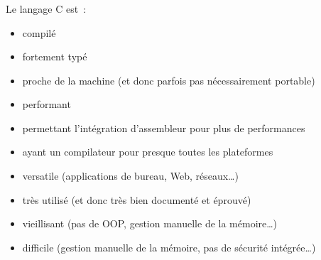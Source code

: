 \begin{frame}
  \frametitle{\secname}
  \framesubtitle{\subsecname}
  {\small Le langage C est~:}
  \begin{itemize}
    \item {\small compilé}
    \item {\small fortement typé}
    \item {\small proche de la machine (et donc parfois pas nécessairement portable)}
    \item {\small performant}
    \item {\small permettant l'intégration d'assembleur pour plus de performances}
    \item {\small ayant un compilateur pour presque toutes les plateformes}
    \item {\small versatile (applications de bureau, Web, réseaux\ldots)}
    \item {\small très utilisé (et donc très bien documenté et éprouvé)}
    \item {\small vieillisant (pas de OOP, gestion manuelle de la mémoire\ldots)}
    \item {\small difficile (gestion manuelle de la mémoire, pas de sécurité intégrée\ldots)}
  \end{itemize}
\end{frame}


